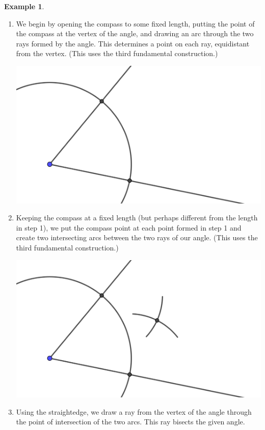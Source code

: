 \documentclass[11pt]{article}
\theoremstyle{definition}
\newtheorem{example}[theorem]{Example}
\begin{document}
\begin{example}
  \begin{enumerate}
    \item We begin by opening the compass to some fixed length, putting the point of the compass at the vertex of the angle, and drawing an arc through the two 
      rays formed by the angle. This determines a point on each ray, equidistant from the vertex. (This uses the third fundamental construction.)
  \begin{center}
    \includegraphics[scale=.75]{bisect_angle_2.png}
  \end{center}
  \item Keeping the compass at a fixed length (but perhaps different from the length in step 1), we put the compass point at each point formed in step 1
    and create two intersecting arcs between the two rays of our angle. (This uses the third fundamental construction.)
  \begin{center}
    \includegraphics[scale=.75]{bisect_angle_3.png}
  \end{center}
  \item Using the straightedge, we draw a ray from the vertex of the angle through the point of intersection of the two arcs. This ray bisects the given angle.

\end{enumerate}
\end{example}
\end{document}
